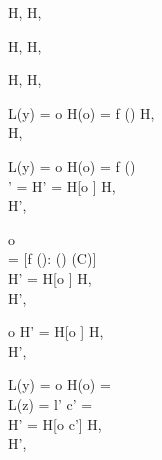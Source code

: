 \begin{figure}[]
  {H,  \; \FRedTo \; H, }

  \RuleSpace{}

  {H,  \; \FRedTo \; H, }

  \RuleSpace{}

  {H,  \; \FRedTo \; H, }

  \RuleSpace{}

  {L(y) = o \andalso H(o) =  \andalso f \in \dom(\FM)}
  {H,  \; \FRedTo  \\ 
  H, }

  \RuleSpace{}

  {L(y) = o \andalso H(o) =  \andalso f \in \dom(\FM) \\
  \FM' = \FM[f \mapsto L(z)] \andalso H' = H[o \mapsto {}]}
  {H,  \; \FRedTo \\
   H', }

  \RuleSpace{}

  {o \\
  \FM = [f \mapsto {}(\sigma): () \in \fdecls(C)] \\
  H' = H[o \mapsto {}]}
  {H,  \; \FRedTo \\
  H', }
  
  \RuleSpace{}

  {o \andalso
  H' = H[o \mapsto \Cell{\emptyset, \bot_{\LatVals{}}}]}
  {H,  \; \FRedTo \\
  H', }

  \RuleSpace{}
  
  {L(y) = o \andalso H(o) =  \\
  L(z) = l' \andalso c' =  \\
  H' = H[o \mapsto c']}
  {H,  \; \FRedTo \\
  H', }


\end{figure}
